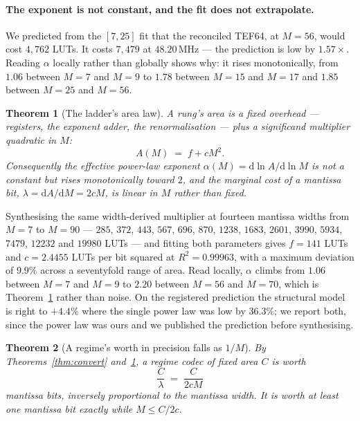 \documentclass[11pt]{article}
\newtheorem{theorem}{Theorem}
\theoremstyle{definition}
\begin{document}
\paragraph{The exponent is not constant, and the fit does not extrapolate.} We
predicted from the $[7,25]$ fit that the reconciled TEF64, at $M = 56$, would
cost $4{,}762$ LUTs. It costs $7{,}479$ at $48.20$\,MHz --- the prediction is low
by $1.57\times$. Reading $\alpha$ locally rather than globally shows why: it rises
monotonically, from $1.06$ between $M{=}7$ and $M{=}9$ to $1.78$ between $M{=}15$
and $M{=}17$ and $1.85$ between $M{=}25$ and $M{=}56$.

\begin{theorem}[The ladder's area law]
\label{thm:alpha}
A rung's area is a fixed overhead --- registers, the exponent adder, the
renormalisation --- plus a significand multiplier quadratic in $M$:
\[
A(M) \;=\; f + cM^{2}.
\]
Consequently the effective power-law exponent
$\alpha(M) = \mathrm{d}\ln A/\mathrm{d}\ln M$ is not a constant but rises
monotonically toward $2$, and the marginal cost of a mantissa bit,
$\lambda = \mathrm{d}A/\mathrm{d}M = 2cM$, is \emph{linear} in $M$ rather than
fixed.
\end{theorem}

Synthesising the same width-derived multiplier at fourteen mantissa widths from
$M{=}7$ to $M{=}90$ --- $285$, $372$, $443$, $567$, $696$, $870$, $1238$, $1683$,
$2601$, $3990$, $5934$, $7479$, $12232$ and $19980$ LUTs --- and fitting both
parameters gives $f = 141$ LUTs and $c = 2.4455$ LUTs per bit squared at
$R^2 = 0.99963$, with a maximum deviation of $9.9\%$ across a seventyfold range of
area. Read locally, $\alpha$ climbs from $1.06$ between $M{=}7$ and $M{=}9$ to
$2.20$ between $M{=}56$ and $M{=}70$, which is Theorem~\ref{thm:alpha} rather than
noise. On the registered prediction the structural model is right to $+4.4\%$
where the single power law was low by $36.3\%$; we report both, since the power
law was ours and we published the prediction before synthesising.

\begin{theorem}[A regime's worth in precision falls as $1/M$]
\label{thm:oneoverm}
By Theorems~\ref{thm:convert} and~\ref{thm:alpha}, a regime codec of fixed area
$C$ is worth
\[
\frac{C}{\lambda} \;=\; \frac{C}{2cM}
\]
mantissa bits, inversely proportional to the mantissa width. It is worth at least
one mantissa bit exactly while $M \leq C/2c$.
\end{theorem}
\end{document}
